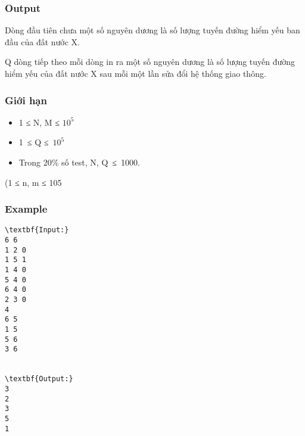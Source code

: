 \subsubsection{   Output  }

   Dòng đầu tiên chưa một số nguyên dương là số lượng tuyến đường hiểm yếu ban đầu của đất nước X.  

   Q dòng tiếp theo mỗi dòng in ra một số nguyên dương là số lượng tuyến đường hiểm yếu của đất nước X sau mỗi một lần sửa đổi hệ thống giao thông.  

\subsubsection{   Giới hạn  }
\begin{itemize}
	\item     1 ≤ N, M ≤ $10^{5}$
	\item     1 ≤ Q ≤ $10^{5}$
	\item     Trong 20\% số test, N, Q ≤ 1000.   
\end{itemize}     (1 ≤ n, m ≤ 105    

\subsubsection{   Example  }
\begin{verbatim}
\textbf{Input:}
6 6
1 2 0
1 5 1
1 4 0
5 4 0
6 4 0
2 3 0
4
6 5
1 5
5 6
3 6


\textbf{Output:}
3
2
3
5
1

\end{verbatim}
